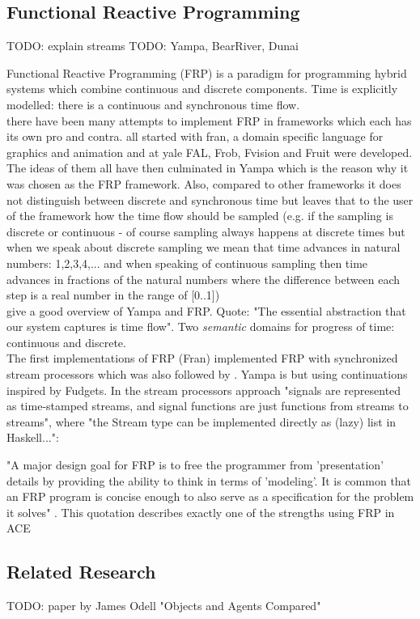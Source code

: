 \subsection{Functional Reactive Programming}
TODO: explain streams
TODO: Yampa, BearRiver, Dunai

Functional Reactive Programming (FRP) is a paradigm for programming hybrid systems which combine continuous and discrete components. Time is explicitly modelled: there is a continuous and synchronous time flow.  \\

there have been many attempts to implement FRP in frameworks which each has its own pro and contra. all started with fran, a domain specific language for graphics and animation and at yale FAL, Frob, Fvision and Fruit were developed. The ideas of them all have then culminated in Yampa which is the reason why it was chosen as the FRP framework. Also, compared to other frameworks it does not distinguish between discrete and synchronous time but leaves that to the user of the framework how the time flow should be sampled (e.g. if the sampling is discrete or continuous - of course sampling always happens at discrete times but when we speak about discrete sampling we mean that time advances in natural numbers: 1,2,3,4,... and when speaking of continuous sampling then time advances in fractions of the natural numbers where the difference between each step is a real number in the range of [0..1]) \\

\cite{Nilsson2002} give a good overview of Yampa and FRP. Quote: "The essential abstraction that our system captures is time flow". Two \textit{semantic} domains for progress of time: continuous and discrete. \\

The first implementations of FRP (Fran) implemented FRP with synchronized stream processors which was also followed by \cite{Wan2000}. Yampa is but using continuations inspired by Fudgets. In the stream processors approach "signals are represented as time-stamped streams, and signal functions are just functions from streams to streams", where "the Stream type can be implemented directly as (lazy) list in Haskell...":

"A major design goal for FRP is to free the programmer from 'presentation' details by providing the ability to think in terms of 'modeling'. It is common that an FRP program is concise enough to also serve as a specification for the problem it solves" \cite{Wan2000}. This quotation describes exactly one of the strengths using FRP in ACE \\

\subsection{Related Research}
TODO: paper by James Odell "Objects and Agents Compared"
